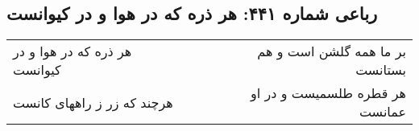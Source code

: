 \begin{center}
\section*{رباعی شماره ۴۴۱: هر ذره که در هوا و در کیوانست}
\label{sec:0441}
\begin{longtable}{l p{0.5cm} r}
هر ذره که در هوا و در کیوانست
&&
بر ما همه گلشن است و هم بستانست
\\
هرچند که زر ز راههای کانست
&&
هر قطره طلسمیست و در او عمانست
\\
\end{longtable}
\end{center}
